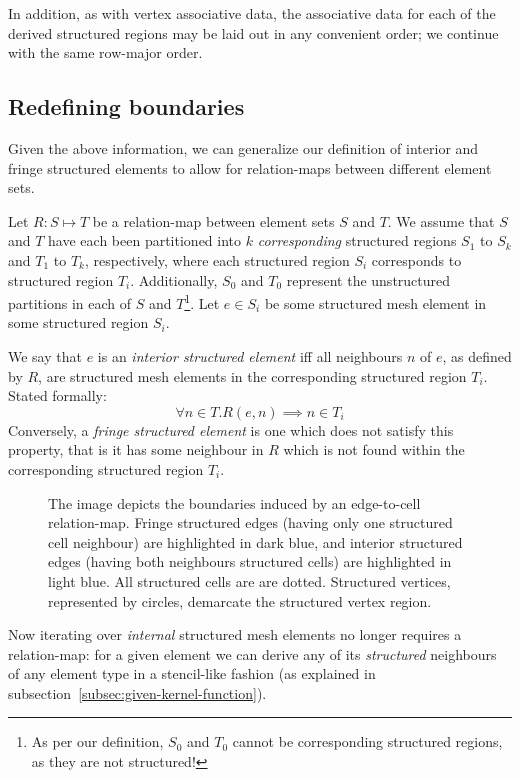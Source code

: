 In addition, as with vertex associative data, the associative data for each of the derived structured regions may be laid out in any convenient order; we continue with the same row-major order.

\subsection{Redefining boundaries}
Given the above information, we can generalize our definition of interior and fringe structured elements to allow for relation-maps between different element sets.

Let $R: S \mapsto T$ be a relation-map between element sets $S$ and $T$. We assume that $S$ and $T$ have each been partitioned into $k$ \emph{corresponding} structured regions $S_1$ to $S_k$ and $T_1$ to $T_k$, respectively, where each structured region $S_i$ corresponds to structured region $T_i$. Additionally, $S_0$ and $T_0$ represent the unstructured partitions in each of $S$ and $T$\footnote{As per our definition, $S_0$ and $T_0$ cannot be corresponding structured regions, as they are not structured!}.
Let $e \in S_i$ be some structured mesh element in some structured region $S_i$.

We say that $e$ is an \emph{interior structured element} iff all neighbours $n$ of $e$, as defined by $R$, are structured mesh elements in the corresponding structured region $T_i$. Stated formally:
$$\forall n \in T. R(e,n) \implies n \in T_i$$
Conversely, a \emph{fringe structured element} is one which does not satisfy this property, that is it has some neighbour in $R$ which is not found within the corresponding structured region $T_i$.



\begin{figure}

\caption{The image depicts the boundaries induced by an edge-to-cell relation-map. Fringe structured edges (having only one structured cell neighbour) are highlighted in dark blue, and interior structured edges (having both neighbours structured cells) are highlighted in light blue. All structured cells are are dotted. Structured vertices, represented by circles, demarcate the structured vertex region.}
\label{fig:fringe-edges}
\end{figure}





Now iterating over \emph{internal} structured mesh elements no longer requires a relation-map: for a given element we can derive any of its \emph{structured} neighbours of any element type in a stencil-like fashion (as explained in subsection~\ref{subsec:given-kernel-function}).

